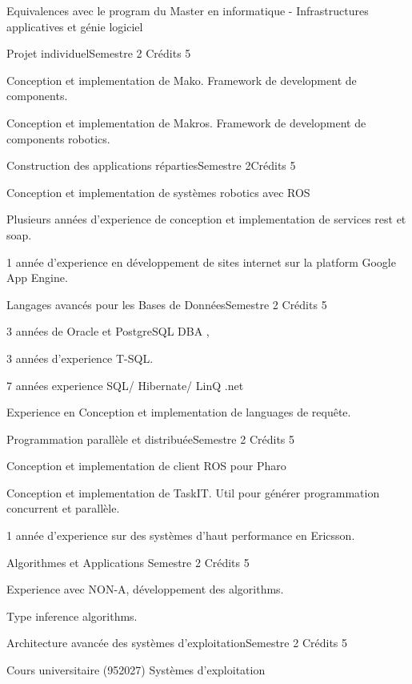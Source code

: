\documentclass{resume} %
\begin{document}
\begin{rSection}{Equivalences avec le program du Master en informatique - Infrastructures applicatives et génie logiciel}
\begin{rSubsection}{Projet individuel}{Semestre 2}{ Crédits 5 }
		\item Conception et implementation de Mako. Framework de development de components.
		\item Conception et implementation de Makros. Framework de development de components robotics.
	\end{rSubsection}
	\begin{rSubsection}{Construction des applications réparties}{Semestre 2}{Crédits 5}
		\item Conception et implementation de systèmes robotics avec ROS
		\item Plusieurs années d'experience de conception et implementation de services rest et soap.
		\item 1 année d'experience en développement de sites internet sur la platform Google App Engine.
	\end{rSubsection}
	\begin{rSubsection}{Langages avancés pour les Bases de Données}{Semestre 2}{ Crédits 5 }
		\item 3 années de Oracle et PostgreSQL DBA , 
		\item 3 années d’experience T-SQL. 
		\item 7 années experience SQL/ Hibernate/ LinQ .net
		\item Experience en Conception et implementation de languages de requête. 
	\end{rSubsection}
	\begin{rSubsection}{Programmation parallèle et distribuée}{Semestre 2}{ Crédits 5 }
		\item Conception et implementation de client ROS pour Pharo
		\item Conception et implementation de TaskIT. Util pour générer programmation concurrent et parallèle. 
		\item 1 année d'experience sur des systèmes d'haut performance en Ericsson. 
	\end{rSubsection}
	\begin{rSubsection}{Algorithmes et Applications }{Semestre 2}{ Crédits 5 }
		\item Experience avec NON-A, développement des algorithms. 
		\item Type inference algorithms. 
	\end{rSubsection}
	\begin{rSubsection}{ Architecture avancée des systèmes d'exploitation}{Semestre 2}{ Crédits 5 }
		\item Cours universitaire (952027) Syst\`{e}mes d'exploitation 


\end{rSubsection}
\end{rSection}
\end{document}
